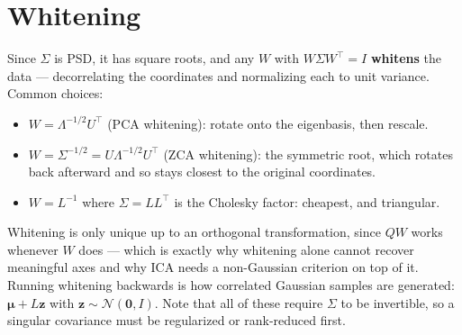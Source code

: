 \documentclass[conference]{IEEEtran}
\begin{document}
\section*{Whitening}
Since $\Sigma$ is PSD, it has square roots, and any $W$ with $W\Sigma W^{\!\top} = I$ \textbf{whitens} the data --- decorrelating the coordinates and normalizing each to unit variance. Common choices:
\begin{itemize}
    \item $W = \Lambda^{-1/2}U^{\!\top}$ (PCA whitening): rotate onto the eigenbasis, then rescale.
    \item $W = \Sigma^{-1/2} = U\Lambda^{-1/2}U^{\!\top}$ (ZCA whitening): the symmetric root, which rotates back afterward and so stays closest to the original coordinates.
    \item $W = L^{-1}$ where $\Sigma = LL^{\!\top}$ is the Cholesky factor: cheapest, and triangular.
\end{itemize}
Whitening is only unique up to an orthogonal transformation, since $QW$ works whenever $W$ does --- which is exactly why whitening alone cannot recover meaningful axes and why ICA needs a non-Gaussian criterion on top of it. Running whitening backwards is how correlated Gaussian samples are generated: $\boldsymbol{\mu} + L\mathbf{z}$ with $\mathbf{z} \sim \mathcal{N}(\mathbf{0},I)$. Note that all of these require $\Sigma$ to be invertible, so a singular covariance must be regularized or rank-reduced first.
\end{document}
